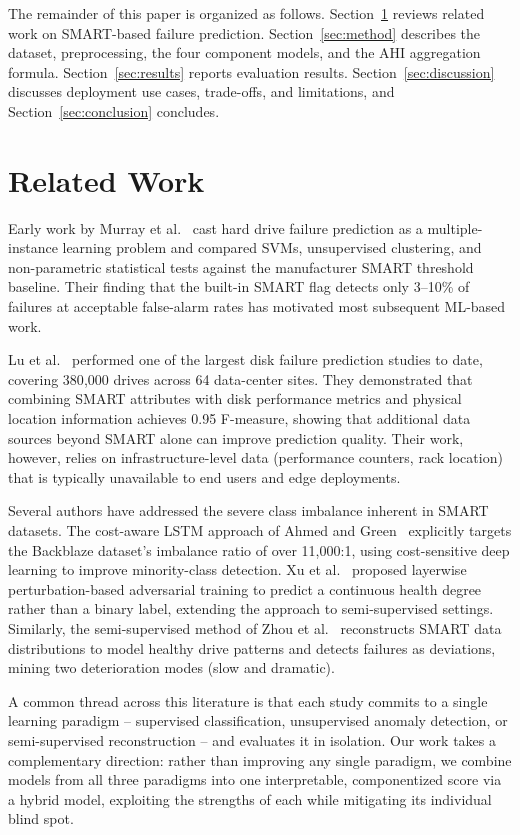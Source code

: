 \documentclass[sigconf,natbib=false, language=english]{acmart}
\begin{document}
The remainder of this paper is organized as follows. Section~\ref{sec:related} reviews related work on SMART-based failure prediction. Section~\ref{sec:method} describes the dataset, preprocessing, the four component models, and the AHI aggregation formula. Section~\ref{sec:results} reports evaluation results. Section~\ref{sec:discussion} discusses deployment use cases, trade-offs, and limitations, and Section~\ref{sec:conclusion} concludes.

\section{Related Work}
\label{sec:related}

Early work by Murray et al.~\cite{murray2005} cast hard drive failure prediction as a multiple-instance learning problem and compared SVMs, unsupervised clustering, and non-parametric statistical tests against the manufacturer SMART threshold baseline. Their finding that the built-in SMART flag detects only 3--10\% of failures at acceptable false-alarm rates has motivated most subsequent ML-based work.

Lu et al.~\cite{lu2020smarter} performed one of the largest disk failure prediction studies to date, covering 380{,}000 drives across 64 data-center sites. They demonstrated that combining SMART attributes with disk performance metrics and physical location information achieves 0.95 F-measure, showing that additional data sources beyond SMART alone can improve prediction quality. Their work, however, relies on infrastructure-level data (performance counters, rack location) that is typically unavailable to end users and edge deployments.

Several authors have addressed the severe class imbalance inherent in SMART datasets. The cost-aware LSTM approach of Ahmed and Green~\cite{ahmed2024costaware} explicitly targets the Backblaze dataset's imbalance ratio of over 11{,}000:1, using cost-sensitive deep learning to improve minority-class detection. Xu et al.~\cite{xu2018layerwise} proposed layerwise perturbation-based adversarial training to predict a continuous health degree rather than a binary label, extending the approach to semi-supervised settings. Similarly, the semi-supervised method of Zhou et al.~\cite{zhou2024proactive} reconstructs SMART data distributions to model healthy drive patterns and detects failures as deviations, mining two deterioration modes (slow and dramatic).

A common thread across this literature is that each study commits to a single learning paradigm -- supervised classification, unsupervised anomaly detection, or semi-supervised reconstruction -- and evaluates it in isolation. Our work takes a complementary direction: rather than improving any single paradigm, we combine models from all three paradigms into one interpretable, componentized score via a hybrid model, exploiting the strengths of each while mitigating its individual blind spot.
\end{document}
